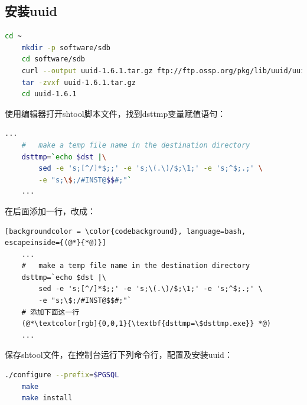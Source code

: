 \subsection{安装uuid}
\begin{lstlisting}[backgroundcolor = \color{codebackground}, language=bash]
	cd ~
	mkdir -p software/sdb
	cd software/sdb
	curl --output uuid-1.6.1.tar.gz ftp://ftp.ossp.org/pkg/lib/uuid/uuid-1.6.1.tar.gz
	tar -zvxf uuid-1.6.1.tar.gz
	cd uuid-1.6.1
\end{lstlisting}

使用编辑器打开shtool脚本文件，找到dsttmp变量赋值语句：
\begin{lstlisting}[backgroundcolor = \color{codebackground}, language=bash]
	...
	#   make a temp file name in the destination directory
	dsttmp=`echo $dst |\
		sed -e 's;[^/]*$;;' -e 's;\(.\)/$;\1;' -e 's;^$;.;' \
		-e "s;\$;/#INST@$$#;"`
	...
\end{lstlisting}

在后面添加一行，改成：

\begin{lstlisting}[backgroundcolor = \color{codebackground}, language=bash, escapeinside={(@*}{*@)}]
	...
	#   make a temp file name in the destination directory
	dsttmp=`echo $dst |\
		sed -e 's;[^/]*$;;' -e 's;\(.\)/$;\1;' -e 's;^$;.;' \
		-e "s;\$;/#INST@$$#;"`
	# 添加下面这一行
	(@*\textcolor[rgb]{0,0,1}{\textbf{dsttmp=\$dsttmp.exe}} *@)
	...
\end{lstlisting}

保存shtool文件，在控制台运行下列命令行，配置及安装uuid：

\begin{lstlisting}[backgroundcolor = \color{codebackground}, language=bash]
	./configure --prefix=$PGSQL
	make 
	make install
\end{lstlisting}

